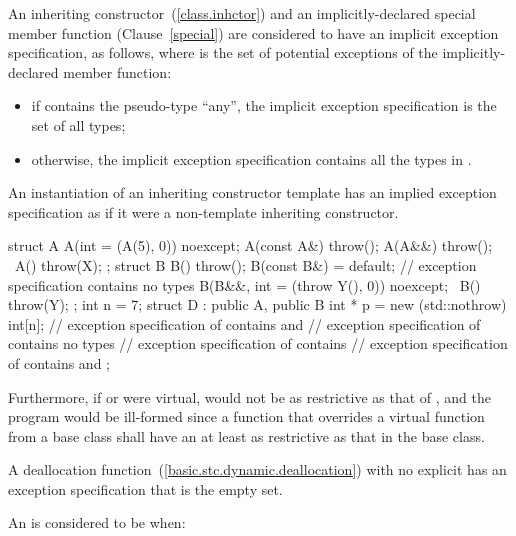 \pnum
An inheriting constructor~(\ref{class.inhctor}) and an implicitly-declared
special member function (Clause~\ref{special}) are considered to have an
implicit exception specification, as follows, where
 is the set of potential exceptions of the
implicitly-declared member function:
\begin{itemize}
\item
if  contains the pseudo-type ``any'',
the implicit exception specification is the set of all types;
\item
otherwise, the implicit exception specification
contains all the types in .
\end{itemize}

\enternote An instantiation of an inheriting constructor template has
an implied exception specification as if it were a non-template
inheriting constructor.\exitnote
\enterexample
\begin{codeblock}
struct A {
  A(int = (A(5), 0)) noexcept;
  A(const A&) throw();
  A(A&&) throw();
  ~A() throw(X);
};
struct B {
  B() throw();
  B(const B&) = default; // exception specification contains no types
  B(B&&, int = (throw Y(), 0)) noexcept;
  ~B() throw(Y);
};
int n = 7;
struct D : public A, public B {
    int * p = new (std::nothrow) int[n];
    // exception specification of  contains  and 
    // exception specification of  contains no types
    // exception specification of  contains 
    // exception specification of  contains  and 
};
\end{codeblock}

Furthermore, if
or
were virtual,
would not be as restrictive as that of
,
and the program would be ill-formed since a function that overrides a virtual
function from a base class shall have an 
 at least as restrictive as that in the base class.
\exitexample

\pnum
A deallocation function~(\ref{basic.stc.dynamic.deallocation})
with no explicit 
has an exception specification that is the empty set.

\pnum
An  is considered to be  when:

